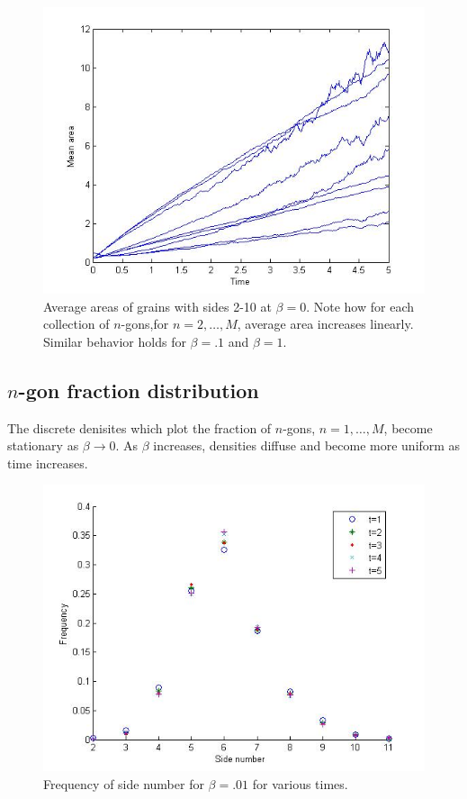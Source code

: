 \documentclass{amsart}
\begin{document}
\begin{figure}
\begin{centering}
\includegraphics[width=.5\textwidth]{averageareas.jpg}
\caption{Average areas of grains with sides 2-10 at $\beta= 0$.  Note how for each collection of $n$-gons,for $n= 2, \dots, M$, average area increases linearly.  Similar behavior holds for $\beta= .1$ and $\beta= 1.$}\label{averagewhole}
\end{centering}
\end{figure}
\subsection{$n$-gon fraction distribution}
The discrete denisites which plot the fraction of $n$-gons, $n = 1, \dots, M$, become stationary as $\beta \rightarrow 0$.  As $\beta$ increases, densities diffuse and become more uniform as time increases. 

\begin{figure}
        \begin{centering}
        \includegraphics[width=.5\textwidth]{classdistzero.jpg}
        \caption{Frequency of side number for $\beta= .01$ for various times.}\label{sidedist1}
\end{centering}
\end{figure}
\end{document}
